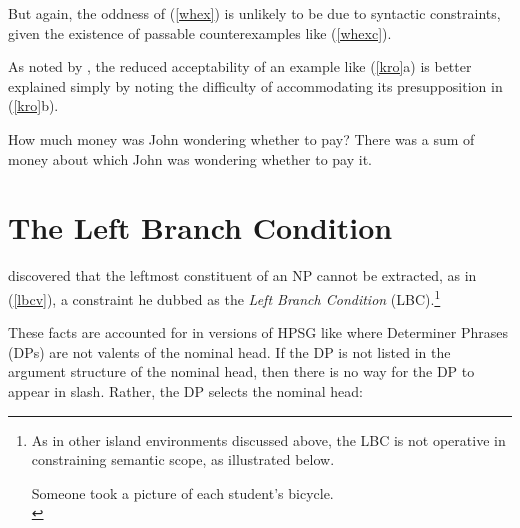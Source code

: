 \documentclass[output=paper
	        ,collection
	        ,collectionchapter
 	        ,biblatex
                ,babelshorthands
                ,newtxmath
                ,draftmode
                ,colorlinks, citecolor=brown
]{langscibook}
\begin{document}
\noindent
But again, the oddness of (\ref{whex})  is unlikely to be due to syntactic constraints,
given the existence of passable counterexamples like (\ref{whexc}).

\eal \label{whexc}
\zl

As noted by \citet{kroch89}, the reduced acceptability of an example like (\ref{kro}a) is better explained simply
by noting the difficulty of accommodating its presupposition in (\ref{kro}b).


\eal \label{kro}
\ex How much money was John wondering whether to pay?
\ex There was a sum of money about which John was wondering whether
to pay it.
\zl


\section{The Left Branch Condition}

\citet{Ross67} discovered that the leftmost constituent of an NP cannot be extracted, 
as in  (\ref{lbcv}), a constraint he dubbed as the \emph{Left Branch Condition} (LBC).\footnote{As in other island environments discussed above, the LBC is not operative in constraining semantic scope, as illustrated below.

\ea
Someone took a picture of each student's bicycle.\\
\citep[303]{MRS}
\zlast}
 
 
\eal \label{lbcv}
 

\zl


\noindent
These facts are accounted for in versions of HPSG like \citet{cxsag07} where Determiner Phrases (DPs) are not valents of the nominal head. If the DP is not listed in the argument structure of the nominal head, then there is no way for the DP to appear in {\sc slash}.  Rather, the DP selects the nominal head:
\end{document}
